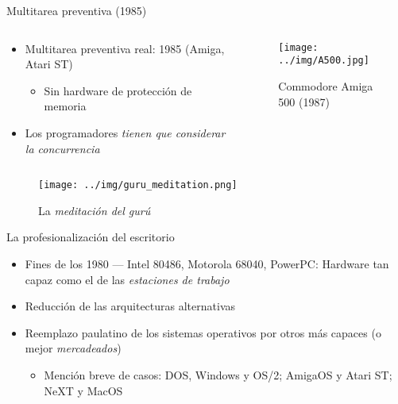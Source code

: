 \documentclass[presentation]{beamer}
\begin{document}
\begin{frame}[label={sec:org8688c89}]{Multitarea preventiva (1985)}
\begin{columns}\begin{column}{0.5\textwidth}
\begin{itemize}
\item Multitarea preventiva real: 1985 (Amiga, Atari ST)
\begin{itemize}
\item Sin hardware de protección de memoria
\end{itemize}
\item Los programadores \emph{tienen que considerar la concurrencia}
\end{itemize}
\end{column}\begin{column}{0.4\textwidth}
\begin{figure}[htbp]
\centering
\texttt{[image: ../img/A500.jpg]}
\caption{Commodore Amiga 500 (1987)}
\end{figure}
\end{column}\end{columns} \pause
\begin{figure}[htbp]
\centering
\texttt{[image: ../img/guru\_meditation.png]}
\caption{La \emph{meditación del gurú}}
\end{figure}
\end{frame}

\begin{frame}[label={sec:org98044a6}]{La profesionalización del escritorio}
\begin{itemize}
\item Fines de los 1980 — Intel 80486, Motorola 68040, PowerPC: Hardware
tan capaz como el de las \emph{estaciones de trabajo}
\item Reducción de las arquitecturas alternativas
\item Reemplazo paulatino de los sistemas operativos por otros más capaces
(o mejor \emph{mercadeados})
\begin{itemize}
\item Mención breve de casos: DOS, Windows y OS/2; AmigaOS y Atari ST;
NeXT y MacOS
\end{itemize}
\end{itemize}
\end{frame}
\end{document}
